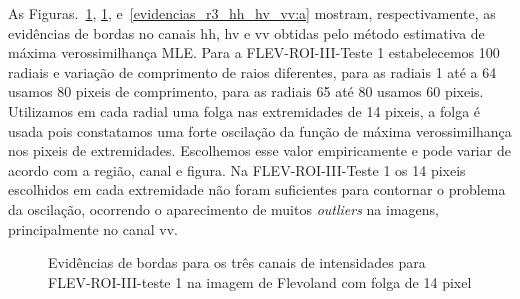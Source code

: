 As Figuras.~\ref{evidencias_r3_hh_hv_vv}, \ref{evidencias_r3_hh_hv_vv}, e~\ref{evidencias_r3_hh_hv_vv:a} mostram, respectivamente, as evidências de bordas no canais hh, hv e vv obtidas pelo método estimativa de máxima verossimilhança MLE. Para a FLEV-ROI-III-Teste 1 estabelecemos 100 radiais e variação de comprimento de raios diferentes, para as radiais 1 até a 64 usamos 80 pixeis de comprimento, para as radiais 65 até 80 usamos 60 pixeis. Utilizamos em cada radial uma folga nas extremidades de  14 pixeis, a folga é usada pois constatamos uma forte oscilação da função de máxima verossimilhança nos pixeis de extremidades. Escolhemos esse valor empiricamente e pode variar de acordo com a região, canal e figura. Na FLEV-ROI-III-Teste 1 os 14 pixeis escolhidos em cada extremidade não foram suficientes para contornar o problema da oscilação, ocorrendo o aparecimento de muitos \textit{outliers} na imagens, principalmente no canal vv. 
   \begin{figure}[hbt]
	\centering
     \caption{Evidências de bordas para os três canais de intensidades para FLEV-ROI-III-teste 1 na imagem de Flevoland com folga de 14 pixel}
      \label{evidencias_r3_hh_hv_vv} 
   \end{figure}

